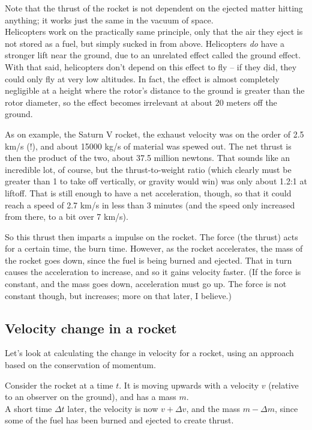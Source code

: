 Note that the thrust of the rocket is not dependent on the ejected matter hitting anything; it works just the same in the vacuum of space.\\
Helicopters work on the practically same principle, only that the air they eject is not stored as a fuel, but simply sucked in from above. Helicopters \emph{do} have a stronger lift near the ground, due to an unrelated effect called the ground effect. With that said, helicopters don't depend on this effect to fly -- if they did, they could only fly at very low altitudes. In fact, the effect is almost completely negligible at a height where the rotor's distance to the ground is greater than the rotor diameter, so the effect becomes irrelevant at about 20 meters off the ground.

As on example, the Saturn V rocket, the exhaust velocity was on the order of 2.5 km/s (!), and about 15000 kg/s of material was spewed out. The net thrust is then the product of the two, about 37.5 million newtons. That sounds like an incredible lot, of course, but the thrust-to-weight ratio (which clearly must be greater than 1 to take off vertically, or gravity would win) was only about 1.2:1 at liftoff. That is still enough to have a net acceleration, though, so that it could reach a speed of 2.7 km/s in less than 3 minutes (and the speed only increased from there, to a bit over 7 km/s).

So this thrust then imparts a impulse on the rocket. The force (the thrust) acts for a certain time, the burn time. However, as the rocket accelerates, the mass of the rocket goes down, since the fuel is being burned and ejected. That in turn causes the acceleration to increase, and so it gains velocity faster. (If the force is constant, and the mass goes down, acceleration must go up. The force is not constant though, but increases; more on that later, I believe.)

\subsection{Velocity change in a rocket}

Let's look at calculating the change in velocity for a rocket, using an approach based on the conservation of momentum.

Consider the rocket at a time $t$. It is moving upwards with a velocity $v$ (relative to an observer on the ground), and has a mass $m$.\\
A short time $\Delta t$ later, the velocity is now $v + \Delta v$, and the mass $m - \Delta m$, since some of the fuel has been burned and ejected to create thrust.

